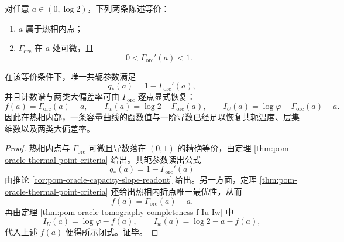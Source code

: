 \begin{theorem}[热相的微分层析与三函数闭式重建]\label{thm:conclusion-oracle-hotphase-differential-tomography}
对任意 \(a\in(0,\log2)\)，下列两条陈述等价：
\begin{enumerate}
  \item \(a\) 属于热相内点；
  \item \(\Gamma_{\mathrm{orc}}\) 在 \(a\) 处可微，且
  \[
  0<\Gamma_{\mathrm{orc}}'(a)<1.
  \]
\end{enumerate}
在该等价条件下，唯一共轭参数满足
\[
q_\ast(a)=1-\Gamma_{\mathrm{orc}}'(a),
\]
并且计数谱与两类大偏差率可由 \(\Gamma_{\mathrm{orc}}\) 逐点显式恢复：
\[
f(a)=\Gamma_{\mathrm{orc}}(a)-a,
\qquad
I_w(a)=\log2-\Gamma_{\mathrm{orc}}(a),
\qquad
I_U(a)=\log\varphi-\Gamma_{\mathrm{orc}}(a)+a.
\]
因此在热相内部，一条容量曲线的函数值与一阶导数已经足以恢复共轭温度、层集维数以及两类大偏差率。
\end{theorem}
\begin{proof}
热相内点与 \(\Gamma_{\mathrm{orc}}\) 可微且导数落在 \((0,1)\) 的精确等价，由定理 \ref{thm:pom-oracle-thermal-point-criteria} 给出。共轭参数读出公式
\[
q_\ast(a)=1-\Gamma_{\mathrm{orc}}'(a)
\]
由推论 \ref{cor:pom-oracle-capacity-slope-readout} 给出。另一方面，定理 \ref{thm:pom-oracle-thermal-point-criteria} 还给出热相内折点唯一最优性，从而
\[
f(a)=\Gamma_{\mathrm{orc}}(a)-a.
\]
再由定理 \ref{thm:pom-oracle-tomography-completeness-f-Iu-Iw} 中
\[
I_U(a)=\log\varphi-f(a),
\qquad
I_w(a)=\log2-a-f(a),
\]
代入上述 \(f(a)\) 便得所示闭式。证毕。
\end{proof}

